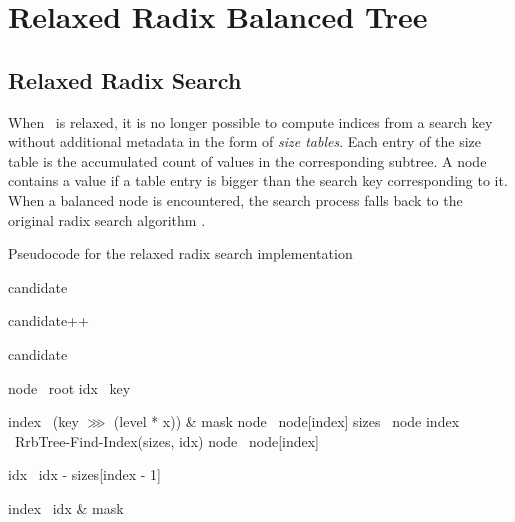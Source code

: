 \chapter{Relaxed Radix Balanced Tree}

\section{Relaxed Radix Search}

When \rbtree\ is relaxed, it is no longer possible to compute indices from a search key without additional metadata in the form of \emph{size tables}. Each entry of the size table is the accumulated count of values in the corresponding subtree. A node contains a value if a table entry is bigger than the search key corresponding to it. When a balanced node is encountered, the search process falls back to the original radix search algorithm . 

\begin{listing}[ht!]        
    \caption{Pseudocode for the relaxed radix search implementation}
    \label{lst:rrb-tree-relaxed-radix-search}        

    \begin{algorithmic}        
            \State candidate 

                \State candidate++
            \EndIf

            \State \Return candidate
        \EndFunction

        \State

            \State node \la\ root
            \State idx \la\ key
            
                    \State index \la\ (key $\ggg$ (level * x)) \& mask
                    \State node \la\ node[index]
                \Else
                    \State sizes \la\ node
                    \State index \la\ RrbTree-Find-Index(sizes, idx)
                    \State node \la\ node[index]

                        \State idx \la\ idx - sizes[index - 1]
                    \EndIf                    
                \EndIf            
            \EndFor

            \State index \la\ idx \& mask
            \State {}
        \EndFunction
    \end{algorithmic}
\end{listing}
